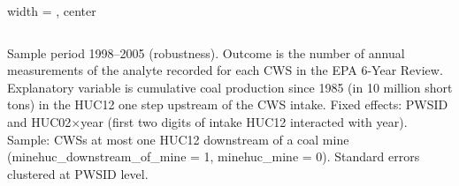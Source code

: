 \begin{table}[htbp]
\begin{adjustbox}{width = \textwidth, center}
\begin{tabular}{lcccccccccccccccccc}
         \bottomrule
         
      \end{tabular}
      
      
      
   \end{adjustbox}
      {\tiny\linespread{1}\selectfont \par \raggedright 
   Sample period 1998--2005 (robustness). Outcome is the number of annual measurements of the analyte recorded for each CWS in the EPA 6-Year Review. Explanatory variable is cumulative coal production since 1985 (in 10 million short tons) in the HUC12 one step upstream of the CWS intake. Fixed effects: PWSID and HUC02$\times$year (first two digits of intake HUC12 interacted with year). Sample: CWSs at most one HUC12 downstream of a coal mine (minehuc\_downstream\_of\_mine = 1, minehuc\_mine = 0). Standard errors clustered at PWSID level.}
   
\end{table}



